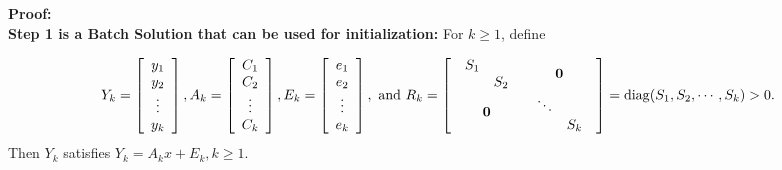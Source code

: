 
\textbf{Proof:} \\


    \textbf{Step 1 is a Batch Solution that can be used for initialization:} For $k \ge 1$, define
    
    $$Y_k=\left[ \begin{array}{c} y_1\\ y_2\\ \vdots \\ y_k \end{array} \right],
    A_k=\left[ \begin{array}{c} C_1\\ C_2\\ \vdots \\ C_k \end{array} \right],
    E_k=\left[ \begin{array}{c} e_1\\ e_2\\ \vdots \\ e_k \end{array} \right], \text{ and } R_k=\left[
    \begin{array}{cc}
        \begin{array}{cc}
            S_1 & \\
            & S_2
        \end{array} &  \mathbf{0} \\
        \mathbf{0} & \begin{array}{cc}
        \ddots & \\
            & S_k
        \end{array}
    \end{array}\right]=\operatorname*{\rm diag}(S_1,S_2,\dotsb,S_k)>0.$$
Then $Y_k$ satisfies  $Y_k=A_kx+E_k, k\ge 1$. 

